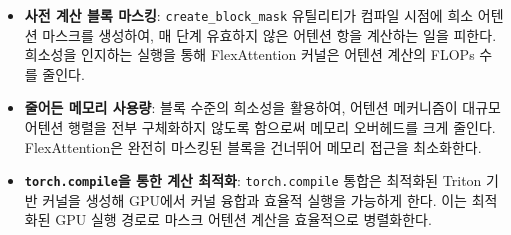 \documentclass{article} %
\begin{document}
\begin{itemize}
    \item \textbf{사전 계산 블록 마스킹}: \texttt{create\_block\_mask} 유틸리티가 컴파일 시점에 희소 어텐션 마스크를 생성하여, 매 단계 유효하지 않은 어텐션 항을 계산하는 일을 피한다. 희소성을 인지하는 실행을 통해 FlexAttention 커널은 어텐션 계산의 FLOPs 수를 줄인다.
    \item \textbf{줄어든 메모리 사용량}: 블록 수준의 희소성을 활용하여, 어텐션 메커니즘이 대규모 어텐션 행렬을 전부 구체화하지 않도록 함으로써 메모리 오버헤드를 크게 줄인다. FlexAttention은 완전히 마스킹된 블록을 건너뛰어 메모리 접근을 최소화한다.
    \item \textbf{\texttt{torch.compile}을 통한 계산 최적화}: \texttt{torch.compile} 통합은 최적화된 Triton 기반 커널을 생성해 GPU에서 커널 융합과 효율적 실행을 가능하게 한다. 이는 최적화된 GPU 실행 경로로 마스크 어텐션 계산을 효율적으로 병렬화한다.
\end{itemize}
\end{document}
